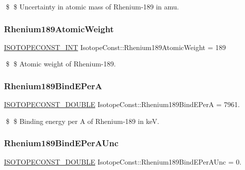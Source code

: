 \$ \$ Uncertainty in atomic mass of Rhenium-\/189 in amu. \mbox{\label{group___isotope_const-_rhenium-_re189_ga0b7490c9ca01ea3c0424ac86267e9726}} 
\subsubsection{\texorpdfstring{Rhenium189\+Atomic\+Weight}{Rhenium189AtomicWeight}}
{\footnotesize\ttfamily \mbox{\hyperlink{group___isotope_const-_macros_ga5f18360b3e99483a35c32d789e62621c}{I\+S\+O\+T\+O\+P\+E\+C\+O\+N\+S\+T\+\_\+\+I\+NT}} Isotope\+Const\+::\+Rhenium189\+Atomic\+Weight = 189}

\$ \$ Atomic weight of Rhenium-\/189. \mbox{\label{group___isotope_const-_rhenium-_re189_gac58131661639cf6a6e6e6f5c2fe9aa56}} 
\subsubsection{\texorpdfstring{Rhenium189\+Bind\+E\+PerA}{Rhenium189BindEPerA}}
{\footnotesize\ttfamily \mbox{\hyperlink{group___isotope_const-_macros_ga8f45a7272ce02c0b4c65c44636ed719a}{I\+S\+O\+T\+O\+P\+E\+C\+O\+N\+S\+T\+\_\+\+D\+O\+U\+B\+LE}} Isotope\+Const\+::\+Rhenium189\+Bind\+E\+PerA = 7961.}

\$ \$ Binding energy per A of Rhenium-\/189 in keV. \mbox{\label{group___isotope_const-_rhenium-_re189_ga927cdef859730ddeb2be1c7883690dce}} 
\subsubsection{\texorpdfstring{Rhenium189\+Bind\+E\+Per\+A\+Unc}{Rhenium189BindEPerAUnc}}
{\footnotesize\ttfamily \mbox{\hyperlink{group___isotope_const-_macros_ga8f45a7272ce02c0b4c65c44636ed719a}{I\+S\+O\+T\+O\+P\+E\+C\+O\+N\+S\+T\+\_\+\+D\+O\+U\+B\+LE}} Isotope\+Const\+::\+Rhenium189\+Bind\+E\+Per\+A\+Unc = 0.}


